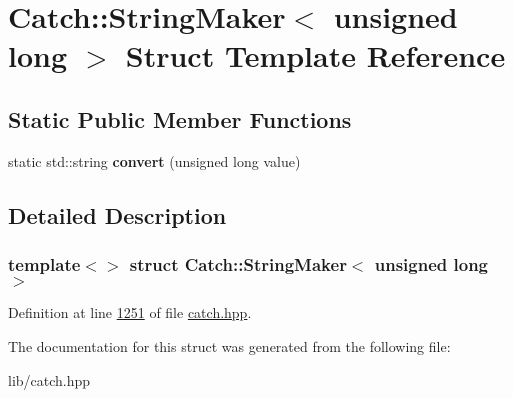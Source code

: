 \hypertarget{structCatch_1_1StringMaker_3_01unsigned_01long_01_4}{}\section{Catch\+::String\+Maker$<$ unsigned long $>$ Struct Template Reference}
\label{structCatch_1_1StringMaker_3_01unsigned_01long_01_4}
\subsection*{Static Public Member Functions}
\begin{DoxyCompactItemize}
\item 
\mbox{\label{structCatch_1_1StringMaker_3_01unsigned_01long_01_4_ae105dc97e4462a86a61b59667f8423c9}} 
static std\+::string {\bfseries convert} (unsigned long value)
\end{DoxyCompactItemize}


\subsection{Detailed Description}
\subsubsection*{template$<$$>$\newline
struct Catch\+::\+String\+Maker$<$ unsigned long $>$}



Definition at line \mbox{\hyperlink{catch_8hpp_source_l01251}{1251}} of file \mbox{\hyperlink{catch_8hpp_source}{catch.\+hpp}}.



The documentation for this struct was generated from the following file\+:\begin{DoxyCompactItemize}
\item 
lib/catch.\+hpp\end{DoxyCompactItemize}
